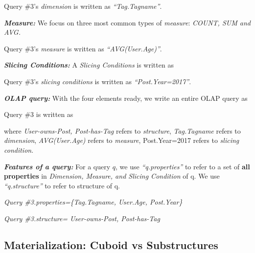 Query \#3's \textit{dimension} is written as \textit{``Tag.Tagname''}.

\textbf{\textit{Measure:}} We focus on three most common types of \textit{measure}: \textit{COUNT, SUM and AVG. }

Query \#3's \textit{measure} is written as \textit{``AVG(User.Age)''}.


\textbf{\textit{Slicing Conditions:}} A \textit{Slicing Conditions} is written as 


Query \#3's \textit{slicing conditions} is written as \textit{``Post.Year=2017''}.

\textbf{\textit{OLAP query:}} With the four elements ready, we write an entire OLAP query as 


Query \#3 is written as 


where \textit{User-owns-Post, Post-has-Tag} refers to  \textit{structure}, \textit{Tag.Tagname} refers to \textit{dimension},\textit{ AVG(User.Age) } refers to \textit{measure}, {Post.Year=2017} refers to \textit{slicing condition}. 



 \textbf{\textit{Features of a query:}} For a query $q$, we use \textit{``q.properties''} to refer to a set of \textbf{all properties} in \textit{Dimension, Measure, and Slicing Condition} of q. We use \textit{``q.structure''} to refer to structure of q.

 \textit{Query \#3.properties=\{Tag.Tagname, User.Age, Post.Year\}}
 
 \textit{Query \#3.structure= User-owns-Post, Post-has-Tag}



\subsection{Materialization: Cuboid vs Substructures}
\label{Materialization: Cuboid vs Substructures}


